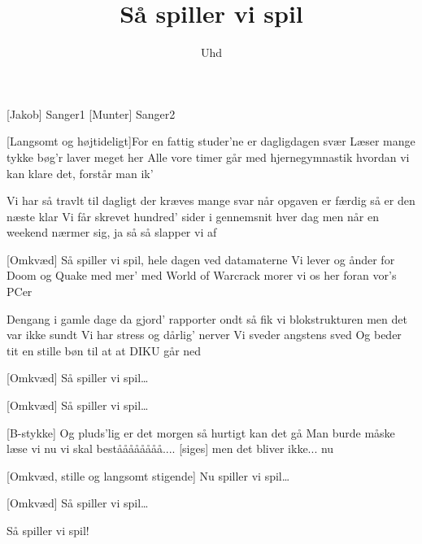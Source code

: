 \documentclass[a4paper,11pt]{article}
\title{Så spiller vi spil}
\author{Uhd}
\begin{document}
\maketitle

\begin{roles}
[Jakob] Sanger1
[Munter] Sanger2
\end{roles}

\begin{props}
\end{props}

  
\begin{song}
[Langsomt og højtideligt]For en fattig studer'ne
er dagligdagen svær
Læser mange tykke bøg'r  
laver meget her
Alle vore timer går med hjernegymnastik
hvordan vi kan klare det, forstår man ik'


 Vi har så travlt til dagligt
der kræves mange svar
når opgaven er færdig
så er den næste klar
Vi får skrevet hundred' sider
i gennemsnit hver dag
men når en weekend nærmer sig, ja så
så slapper vi af

[Omkvæd] Så spiller vi spil, hele dagen
ved datamaterne
Vi lever og ånder
for Doom og Quake med mer'
med World of Warcrack morer vi os
her foran vor's PCer

 Dengang i gamle dage
da gjord' rapporter ondt
så fik vi blokstrukturen
men det var ikke sundt
Vi har stress og dårlig' nerver
Vi sveder angstens sved
Og beder tit en stille bøn til at
at DIKU går ned

[Omkvæd] Så spiller vi spil\ldots

[Omkvæd] Så spiller vi spil\ldots

[B-stykke] Og pluds'lig er det morgen
så hurtigt kan det gå
Man burde måske læse
vi nu vi skal beståååååååå....
[siges] men det bliver ikke... nu

[Omkvæd, stille og langsomt stigende] Nu spiller vi spil\ldots

[Omkvæd] Så spiller vi spil\ldots

 Så spiller vi spil!


\end{song}
\end{document}
